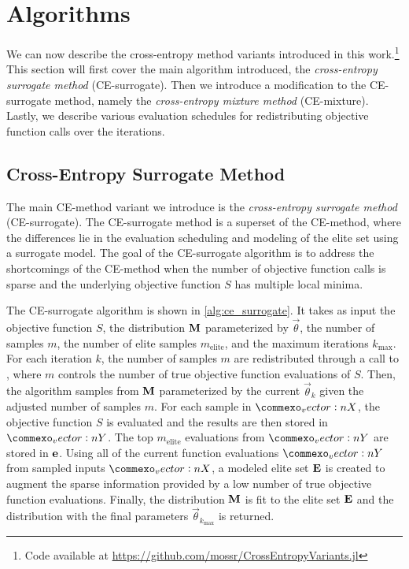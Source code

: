 \section{Algorithms} \label{sec:cem_algorithms}
We can now describe the cross-entropy method variants introduced in this work.\footnote{Code available at \href{https://github.com/mossr/CrossEntropyVariants.jl}{https://github.com/mossr/CrossEntropyVariants.jl}}
This section will first cover the main algorithm introduced, the \textit{cross-entropy surrogate method} (CE-surrogate).
Then we introduce a modification to the CE-surrogate method, namely the \textit{cross-entropy mixture method} (CE-mixture).
Lastly, we describe various evaluation schedules for redistributing objective function calls over the iterations.

\subsection{Cross-Entropy Surrogate Method} \label{sec:cem_alg_ce_surrogate}
The main CE-method variant we introduce is the \textit{cross-entropy surrogate method} (CE-surrogate).
The CE-surrogate method is a superset of the CE-method, where the differences lie in the evaluation scheduling and modeling of the elite set using a surrogate model.
The goal of the CE-surrogate algorithm is to address the shortcomings of the CE-method when the number of objective function calls is sparse and the underlying objective function $S$ has multiple local minima.

The CE-surrogate algorithm is shown in \cref{alg:ce_surrogate}.
It takes as input the objective function $S$, the distribution $\mathbf{M}$ parameterized by $\vec{\theta}$, the number of samples $m$, the number of elite samples $m_\text{elite}$, and the maximum iterations $k_\text{max}$.
For each iteration $k$, the number of samples $m$ are redistributed through a call to , where $m$ controls the number of true objective function evaluations of $S$. %
Then, the algorithm samples from $\mathbf{M}$ parameterized by the current $\vec{\theta}_k$ given the adjusted number of samples $m$.
For each sample in $\mat{X}$, the objective function $S$ is evaluated and the results are then stored in $\mat{Y}$.
The top $m_\text{elite}$ evaluations from $\mat{Y}$ are stored in $\mathbf{e}$. 
Using all of the current function evaluations $\mat{Y}$ from sampled inputs $\mat{X}$, a modeled elite set $\mathbf{E}$ is created to augment the sparse information provided by a low number of true objective function evaluations.
Finally, the distribution $\mathbf{M}$ is fit to the elite set $\mathbf{E}$ and the distribution with the final parameters $\vec{\theta}_{k_\text{max}}$ is returned.

